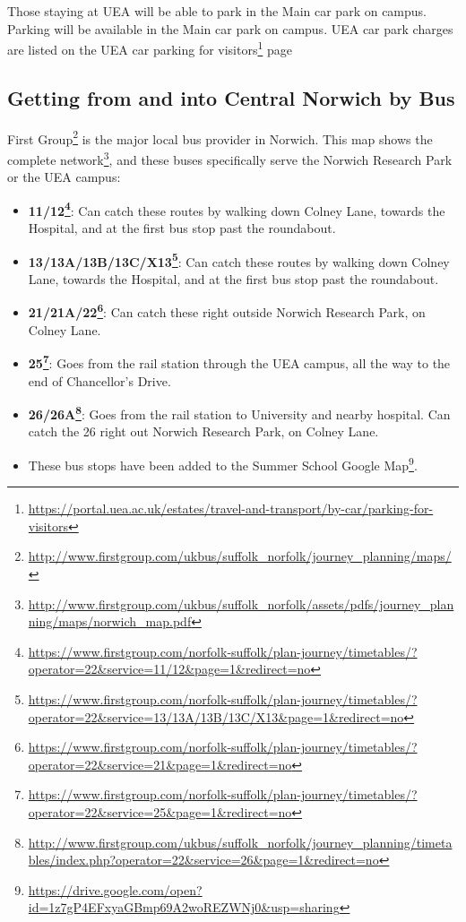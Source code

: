 \documentclass[12pt,]{book}
\providecommand{\tightlist}{%
  \setlength{\itemsep}{0pt}\setlength{\parskip}{0pt}}
\let\rmarkdownfootnote\footnote%
\def\footnote{\protect\rmarkdownfootnote}
\renewcommand{\href}[2]{#2\footnote{\url{#1}}}
\begin{document}
Those staying at UEA will be able to park in the Main car park on
campus. Parking will be available in the Main car park on campus. UEA
car park charges are listed on the
\href{https://portal.uea.ac.uk/estates/travel-and-transport/by-car/parking-for-visitors}{UEA
car parking for visitors} page

\subsection*{Getting from and into Central Norwich by
Bus}\label{getting-from-and-into-central-norwich-by-bus}

\href{http://www.firstgroup.com/ukbus/suffolk_norfolk/journey_planning/maps/}{First
Group} is the major local bus provider in Norwich.
\href{http://www.firstgroup.com/ukbus/suffolk_norfolk/assets/pdfs/journey_planning/maps/norwich_map.pdf}{This
map shows the complete network}, and these buses specifically serve the
Norwich Research Park or the UEA campus:

\begin{itemize}
\tightlist
\item
  \textbf{\href{https://www.firstgroup.com/norfolk-suffolk/plan-journey/timetables/?operator=22\&service=11/12\&page=1\&redirect=no}{11/12}}:
  Can catch these routes by walking down Colney Lane, towards the
  Hospital, and at the first bus stop past the roundabout.
\item
  \textbf{\href{https://www.firstgroup.com/norfolk-suffolk/plan-journey/timetables/?operator=22\&service=13/13A/13B/13C/X13\&page=1\&redirect=no}{13/13A/13B/13C/X13}}:
  Can catch these routes by walking down Colney Lane, towards the
  Hospital, and at the first bus stop past the roundabout.
\item
  \textbf{\href{https://www.firstgroup.com/norfolk-suffolk/plan-journey/timetables/?operator=22\&service=21\&page=1\&redirect=no}{21/21A/22}}:
  Can catch these right outside Norwich Research Park, on Colney Lane.
\item
  \textbf{\href{https://www.firstgroup.com/norfolk-suffolk/plan-journey/timetables/?operator=22\&service=25\&page=1\&redirect=no}{25}}:
  Goes from the rail station through the UEA campus, all the way to the
  end of Chancellor's Drive.
\item
  \textbf{\href{http://www.firstgroup.com/ukbus/suffolk_norfolk/journey_planning/timetables/index.php?operator=22\&service=26\&page=1\&redirect=no}{26/26A}}:
  Goes from the rail station to University and nearby hospital. Can
  catch the 26 right out Norwich Research Park, on Colney Lane.
\item
  These bus stops have been added to the
  \href{https://drive.google.com/open?id=1z7gP4EFxyaGBmp69A2woREZWNj0\&usp=sharing}{Summer
  School Google Map}.
\end{itemize}
\end{document}
